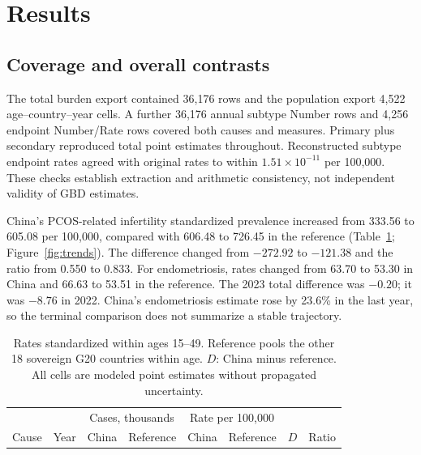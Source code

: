 \documentclass[11pt,a4paper]{article}
\begin{document}
\section{Results}
\subsection{Coverage and overall contrasts}
The total burden export contained 36,176 rows and the population export 4,522 age--country--year cells. A further 36,176 annual subtype Number rows and 4,256 endpoint Number/Rate rows covered both causes and measures. Primary plus secondary reproduced total point estimates throughout. Reconstructed subtype endpoint rates agreed with original rates to within $1.51\times10^{-11}$ per 100,000. These checks establish extraction and arithmetic consistency, not independent validity of GBD estimates.

China's PCOS-related infertility standardized prevalence increased from 333.56 to 605.08 per 100,000, compared with 606.48 to 726.45 in the reference (Table~\ref{tab:prevalence}; Figure~\ref{fig:trends}). The difference changed from $-272.92$ to $-121.38$ and the ratio from 0.550 to 0.833. For endometriosis, rates changed from 63.70 to 53.30 in China and 66.63 to 53.51 in the reference. The 2023 total difference was $-0.20$; it was $-8.76$ in 2022. China's endometriosis estimate rose by 23.6\% in the last year, so the terminal comparison does not summarize a stable trajectory.

\begin{table}[htbp]\centering\small{}
\caption{Total infertility prevalence in China and the reference population.}\label{tab:prevalence}
\setlength{\tabcolsep}{3.5pt}
\begin{tabular}{llrrrrrr}\toprule
 & & \multicolumn{2}{c}{Cases, thousands} & \multicolumn{2}{c}{Rate per 100,000} & & \\
Cause & Year & China & Reference & China & Reference & $D$ & Ratio\\\midrule
\end{tabular}
\caption*{Rates standardized within ages 15--49. Reference pools the other 18 sovereign G20 countries within age. $D$: China minus reference. All cells are modeled point estimates without propagated uncertainty.}
\end{table}
\end{document}
